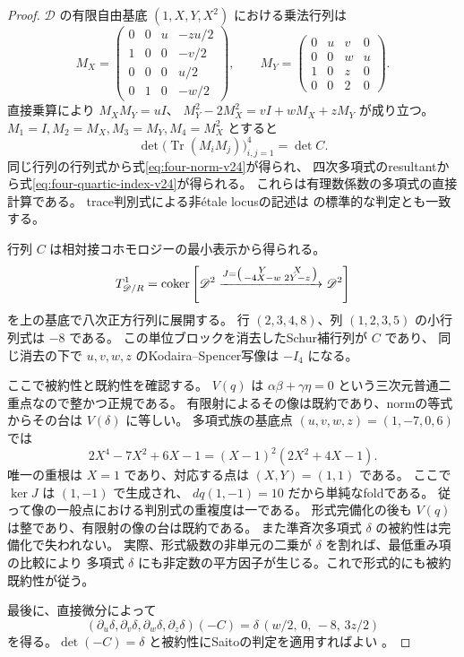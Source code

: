 \begin{proof}
$\mathscr D$ の有限自由基底 $(1,X,Y,X^2)$ における乗法行列は
\[
M_X=\begin{pmatrix}
0&0&u&-zu/2\\1&0&0&-v/2\\0&0&0&u/2\\0&1&0&-w/2
\end{pmatrix},\qquad
M_Y=\begin{pmatrix}
0&u&v&0\\0&0&w&u\\1&0&z&0\\0&0&2&0
\end{pmatrix}.
\]
直接乗算により $M_XM_Y=uI$、
$M_Y^2-2M_X^2=vI+wM_X+zM_Y$ が成り立つ。
$M_1=I,M_2=M_X,M_3=M_Y,M_4=M_X^2$ とすると
\[
 \det\bigl(\operatorname{Tr}(M_iM_j)\bigr)_{i,j=1}^4=\det C.
\]
同じ行列の行列式から式\eqref{eq:four-norm-v24}が得られ、
四次多項式のresultantから式\eqref{eq:four-quartic-index-v24}が得られる。
これらは有理数係数の多項式の直接計算である。
trace判別式による非\'etale locusの記述は
\cite[Tag 0BVH]{Stacks}の標準的な判定とも一致する。

行列 $C$ は相対接コホモロジーの最小表示から得られる。
\[
 T^1_{\mathscr D/R}=\operatorname{coker}\left[
 \mathscr D^2\xrightarrow{
 J=\left(\begin{smallmatrix}Y&X\\-4X-w&2Y-z\end{smallmatrix}\right)}
 \mathscr D^2\right]
\]
を上の基底で八次正方行列に展開する。
行 $(2,3,4,8)$、列 $(1,2,3,5)$ の小行列式は $-8$ である。
この単位ブロックを消去したSchur補行列が $C$ であり、
同じ消去の下で $u,v,w,z$ のKodaira--Spencer写像は $-I_4$ になる。

ここで被約性と既約性を確認する。
$V(q)$ は $\alpha\beta+\gamma\eta=0$ という三次元普通二重点なので整かつ正規である。
有限射によるその像は既約であり、normの等式からその台は $V(\delta)$ に等しい。
多項式族の基底点 $(u,v,w,z)=(1,-7,0,6)$ では
\[
 2X^4-7X^2+6X-1=(X-1)^2(2X^2+4X-1).
\]
唯一の重根は $X=1$ であり、対応する点は $(X,Y)=(1,1)$ である。
ここで $\ker J$ は $(1,-1)$ で生成され、
$dq(1,-1)=10$ だから単純なfoldである。
従って像の一般点における判別式の重複度は一である。
形式完備化の後も $V(q)$ は整であり、有限射の像の台は既約である。
また準斉次多項式 $\delta$ の被約性は完備化で失われない。
実際、形式級数の非単元の二乗が $\delta$ を割れば、最低重み項の比較により
多項式 $\delta$ にも非定数の平方因子が生じる。これで形式的にも被約既約性が従う。

最後に、直接微分によって
\begin{equation}\label{eq:four-saito-identity-v24}
 (\partial_u\delta,\partial_v\delta,\partial_w\delta,\partial_z\delta)(-C)
 =\delta\,(w/2,\,0,\,-8,\,3z/2)
\end{equation}
を得る。$\det(-C)=\delta$ と被約性にSaitoの判定を適用すればよい
\cite[Propositions 1.3, 1.5]{BEvB}。
\end{proof}

